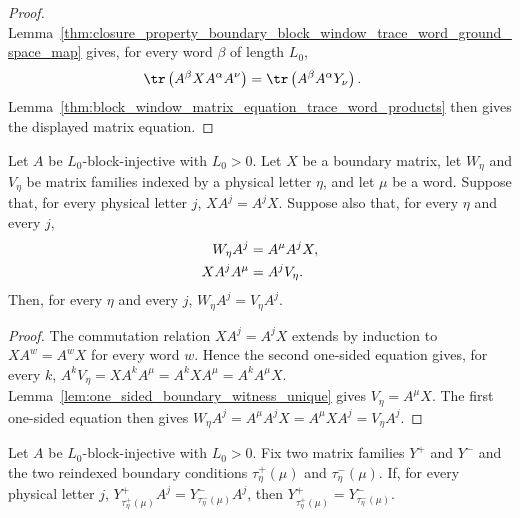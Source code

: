 \begin{proof}
    \leanok
    Lemma~\ref{thm:closure_property_boundary_block_window_trace_word_ground_space_map}
    gives, for every word $\beta$ of length $L_0$,
    \begin{align}
        \tr\left(A^\beta X A^\alpha A^\nu\right)
         & = \tr\left(A^\beta A^\alpha Y_\nu\right).
        \notag
    \end{align}
    Lemma~\ref{thm:block_window_matrix_equation_trace_word_products} then
    gives the displayed matrix equation.
\end{proof}

\begin{lemma}
    \label{lem:boundary_restrictions_from_commutation_one_sided_products}
    \leanok
    Let $A$ be $L_0$-block-injective with $L_0>0$. Let $X$ be a boundary
    matrix, let $W_\eta$ and $V_\eta$ be matrix families indexed by a physical
    letter $\eta$, and let $\mu$ be a word. Suppose that, for every physical
    letter $j$,
    $X A^j = A^jX$.
    Suppose also that, for every $\eta$ and every $j$,
    \begin{align}
        W_\eta A^j & = A^\mu A^jX,
        \notag                     \\
        X A^jA^\mu & = A^jV_\eta.
        \notag
    \end{align}
    Then, for every $\eta$ and every $j$,
    $W_\eta A^j = V_\eta A^j$.
\end{lemma}

\begin{proof}
    \leanok
    The commutation relation $X A^j=A^jX$ extends by induction to
    $X A^w=A^wX$ for every word $w$. Hence the second one-sided equation gives,
    for every $k$,
    $A^kV_\eta = X A^kA^\mu = A^kX A^\mu = A^kA^\mu X$.
    Lemma~\ref{lem:one_sided_boundary_witness_unique} gives
    $V_\eta=A^\mu X$. The first one-sided equation then gives
    $W_\eta A^j = A^\mu A^jX = A^\mu X A^j = V_\eta A^j$.
\end{proof}

\begin{lemma}
    \label{lem:wrapped_mirror_right_products_determine}
    \leanok
    Let $A$ be $L_0$-block-injective with $L_0>0$. Fix two matrix
    families $Y^+$ and $Y^-$ and the two reindexed boundary conditions
    $\tau^+_\eta(\mu)$ and $\tau^-_\eta(\mu)$. If, for every physical letter
    $j$,
    $Y^+_{\tau^+_\eta(\mu)} A^j = Y^-_{\tau^-_\eta(\mu)} A^j$,
    then
    $Y^+_{\tau^+_\eta(\mu)} = Y^-_{\tau^-_\eta(\mu)}$.
\end{lemma}

